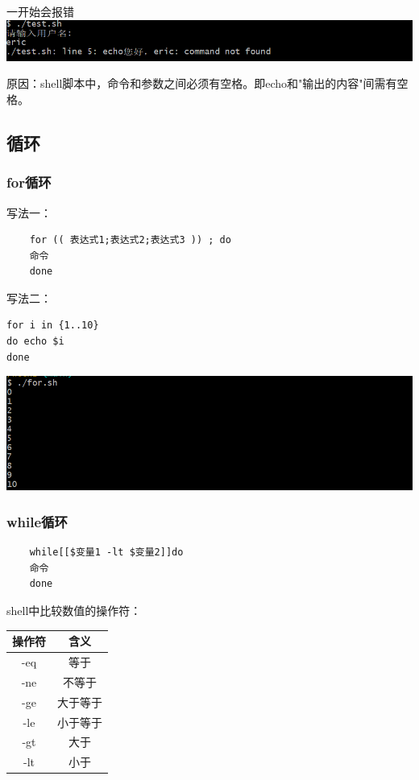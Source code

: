 \documentclass[UTF8,a4paper]{ctexart}
\begin{document}
一开始会报错\\
\includegraphics[width=1\textwidth]{./pictures/变量输入输出2.png}\par
原因：shell脚本中，命令和参数之间必须有空格。即echo和"输出的内容"间需有空格。

\subsection{循环}
\subsubsection{for循环}
写法一：
\begin{lstlisting}
    for (( 表达式1;表达式2;表达式3 )) ; do
    命令
    done
\end{lstlisting}

写法二：
\begin{lstlisting}
for i in {1..10}
do echo $i 
done
\end{lstlisting}
\includegraphics[width=1\textwidth]{./pictures/for2.png}\par

\subsubsection{while循环}
\begin{lstlisting}
    while[[$变量1 -lt $变量2]]do
    命令
    done
\end{lstlisting}
shell中比较数值的操作符：\\
\begin{table}[H]
    \centering
    \begin{tabular}{|c|c|}
        \hline
        操作符 & 含义\\
        \hline
        -eq & 等于\\
        \hline
        -ne & 不等于\\
        \hline
        -ge & 大于等于\\
        \hline
        -le & 小于等于\\
        \hline
        -gt & 大于\\
        \hline
        -lt & 小于\\
        \hline
    \end{tabular}
\end{table}
\end{document}
